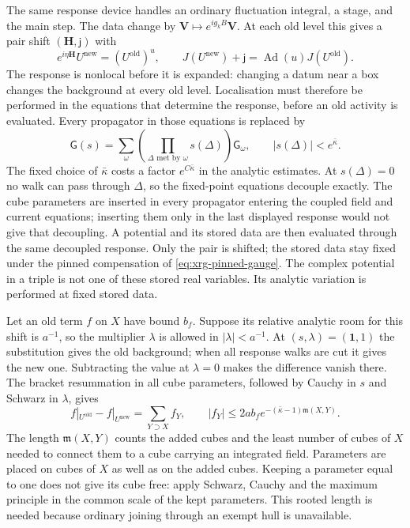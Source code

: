 \documentclass[11pt,letterpaper,reqno]{amsart}
\theoremstyle{definition}
\theoremstyle{remark}
\begin{document}
The same response device handles an
ordinary fluctuation integral, a stage,
and the main step. The data change by
$\mathbf V\mapsto e^{ig_kB}\mathbf V$.
At each old level this gives a pair
shift $(\mathbf H,\mathsf j)$ with
\[
 e^{i\eta\mathbf H}U^{\mathrm{new}}
                  =(U^{\mathrm{old}})^u,
 \qquad
 J(U^{\mathrm{new}})+\mathsf j
                  =\operatorname{Ad}(u)J(U^{\mathrm{old}}).
\]
The response is nonlocal before it is expanded: changing a datum
near a box changes the background at every old level. Localisation
must therefore be performed in the equations that determine the
response, before an old activity is evaluated. Every propagator
in those equations is replaced by
\begin{equation}\label{eq:history-parameter-propagator}
 \mathsf G(s)=\sum_\omega
       \left(\prod_{\Delta\text{ met by }\omega}s(\Delta)\right)
                         \mathsf G_\omega,
       \qquad |s(\Delta)|<e^{\bar\kappa}.
\end{equation}
The fixed choice of $\bar\kappa$ costs a factor $e^{C\bar\kappa}$
in the analytic estimates. At $s(\Delta)=0$ no walk can pass
through $\Delta$, so the fixed-point equations decouple exactly.
The cube parameters are inserted in every propagator entering the
coupled field and current equations; inserting them only in the
last displayed response would not give that decoupling. A potential and its
stored data are then evaluated through
the same decoupled response. Only the
pair is shifted; the stored data stay
fixed under the pinned compensation
of \eqref{eq:xrg-pinned-gauge}. The complex potential in a triple
is not one of these stored real variables. Its analytic variation
is performed at fixed stored data.

Let an old term $f$ on $X$ have bound
$b_f$. Suppose its relative analytic
room for this shift is $a^{-1}$, so
the multiplier $\lambda$ is allowed
in $|\lambda|<a^{-1}$. At $(s,\lambda)=(\mathbf1,1)$ the
substitution gives the old background; when all response walks
are cut it gives the new one. Subtracting the value at
$\lambda=0$ makes the difference vanish there. The bracket
resummation in all cube parameters,
followed by Cauchy in $s$ and Schwarz
in $\lambda$, gives
\begin{equation}\label{eq:xrg-history-localisation}
 f|_{U^{\mathrm{old}}}-f|_{U^{\mathrm{new}}}
       =\sum_{Y\supset X}f_Y,
 \qquad
 |f_Y|\le2ab_f
           e^{-(\bar\kappa-1)\mathfrak m(X,Y)}.
\end{equation}
The length $\mathfrak m(X,Y)$ counts
the added cubes and the least number
of cubes of $X$ needed to connect
them to a cube carrying an integrated
field. Parameters are placed on cubes
of $X$ as well as on the added cubes.
Keeping a parameter equal to one does
not give its cube free: apply Schwarz,
Cauchy and the maximum principle in
the common scale of the kept
parameters. This rooted length is
needed because ordinary joining
through an exempt hull is unavailable.
\end{document}
